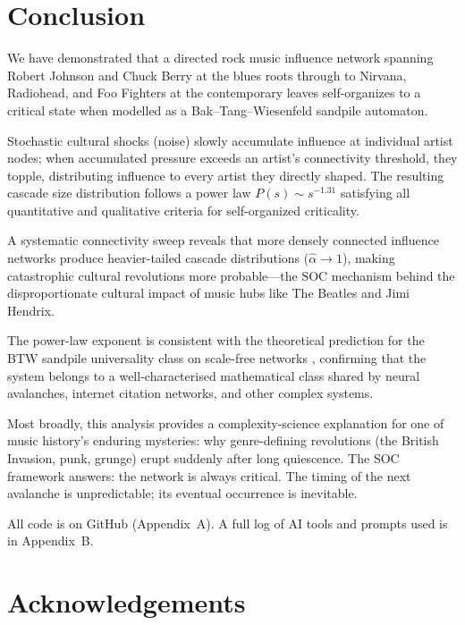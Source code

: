\documentclass[12pt, a4paper]{article}
\begin{document}
\section{Conclusion}
\label{sec:conclusion}

We have demonstrated that a directed rock music influence network
spanning Robert Johnson and Chuck Berry at the blues roots through
to Nirvana, Radiohead, and Foo Fighters at the contemporary
leaves self-organizes to a critical state when modelled as a
Bak--Tang--Wiesenfeld sandpile automaton.

Stochastic cultural shocks (noise) slowly accumulate influence
at individual artist nodes; when accumulated pressure exceeds
an artist's connectivity threshold, they topple, distributing
influence to every artist they directly shaped.
The resulting cascade size distribution follows a power law
$P(s)\sim s^{-1.31}$ satisfying all quantitative and qualitative
criteria for self-organized criticality.

A systematic connectivity sweep reveals that more densely
connected influence networks produce heavier-tailed cascade
distributions ($\hat\alpha\to 1$), making catastrophic
cultural revolutions more probable---the SOC mechanism behind
the disproportionate cultural impact of music hubs like
The Beatles and Jimi Hendrix.

The power-law exponent is consistent with the theoretical
prediction for the BTW sandpile universality class on scale-free
networks \citep{goh2003}, confirming that the system belongs
to a well-characterised mathematical class shared by neural
avalanches, internet citation networks, and other complex
systems.

Most broadly, this analysis provides a complexity-science
explanation for one of music history's enduring mysteries:
why genre-defining revolutions (the British Invasion, punk,
grunge) erupt suddenly after long quiescence.
The SOC framework answers: the network is always critical.
The timing of the next avalanche is unpredictable;
its eventual occurrence is inevitable.

All code is on GitHub (Appendix~A).
A full log of AI tools and prompts used is in Appendix~B.


\section*{Acknowledgements}
\end{document}
